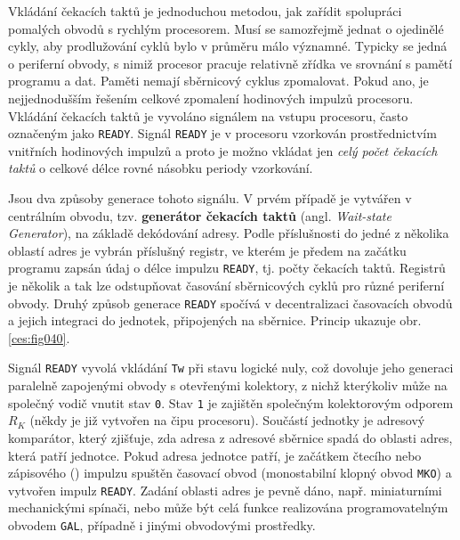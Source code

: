     
      Vkládání čekacích taktů je jednoduchou metodou, jak zařídit spolupráci pomalých obvodů s
      rychlým procesorem. Musí se samozřejmě jednat o ojedinělé cykly, aby prodlužování cyklů bylo v
      průměru málo významné. Typicky se jedná o periferní obvody, s nimiž procesor pracuje relativně
      zřídka ve srovnání s pamětí programu a dat. Paměti nemají sběrnicový cyklus zpomalovat. Pokud
      ano, je nejjednodušším řešením celkové zpomalení hodinových impulzů procesoru. Vkládání
      čekacích taktů je vyvoláno signálem na vstupu procesoru, často označeným jako \texttt{READY}.
      Signál \texttt{READY} je v procesoru vzorkován prostřednictvím vnitřních hodinových impulzů a
      proto je možno vkládat jen \emph{celý počet čekacích taktů} o celkové délce rovné násobku
      periody vzorkování.
      
      Jsou dva způsoby generace tohoto signálu. V prvém případě je vytvářen v centrálním obvodu,
      tzv. \textbf{generátor čekacích taktů} (angl. \emph{Wait-state Generator}), na základě
      dekódování adresy. Podle příslušnosti do jedné z několika oblastí adres je vybrán příslušný
      registr, ve kterém je předem na začátku programu zapsán údaj o délce impulzu \texttt{READY},
      tj. počty čekacích taktů. Registrů je několik a tak lze odstupňovat časování sběrnicových
      cyklů pro různé periferní obvody. Druhý způsob generace \texttt{READY} spočívá v
      decentralizaci časovacích obvodů a jejich integraci do jednotek, připojených na sběrnice.
      Princip ukazuje obr. \ref{ces:fig040}.
      
      
      Signál \texttt{READY} vyvolá vkládání \texttt{Tw} při stavu logické nuly, což dovoluje jeho
      generaci paralelně zapojenými obvody s otevřenými kolektory, z nichž kterýkoliv může na
      společný vodič vnutit stav \texttt{0}. Stav \texttt{1} je zajištěn společným kolektorovým
      odporem \(R_K\) (někdy je již vytvořen na čipu procesoru). Součástí jednotky je adresový
      komparátor, který zjišťuje, zda adresa z adresové sběrnice spadá do oblasti adres, která patří
      jednotce. Pokud adresa jednotce patří, je začátkem čtecího nebo zápisového
      () impulzu spuštěn časovací obvod  (monostabilní klopný obvod
      \texttt{MKO}) a vytvořen impulz \texttt{READY}. Zadání oblasti adres je pevně dáno, např.
      miniaturními mechanickými spínači, nebo může být celá funkce realizována programovatelným
      obvodem \texttt{GAL}, případně i jinými obvodovými prostředky.
      
